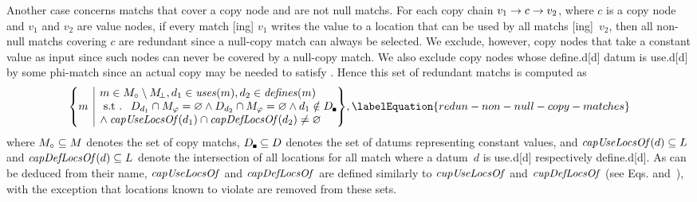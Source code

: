Another case concerns \glspl{match} that cover a \gls{copy node} and are not
\glspl{null match}.
%
For each copy chain \mbox{$v_1 \rightarrow c \rightarrow v_2$}, where $c$ is a
\gls{copy node} and $v_1$ and $v_2$ are \glspl{value node}, if every \gls{match}
[ing] $v_1$ writes the value to a \gls{location} that can be
used by all \glspl{match} [ing]~$v_2$, then all non-\glspl{null
  match} covering $c$ are redundant since a \gls{null-copy match} can always be
selected.
%
We exclude, however, \glspl{copy node} that take a constant value as input since
such \glspl{node} can never be covered by a \gls{null-copy match}.
%
We also exclude \glspl{copy node} whose \gls{define.d}[d] \gls{datum} is
\gls{use.d}[d] by some \gls{phi-match} since an actual copy may be needed to
satisfy .
%
Hence this set of redundant \glspl{match} is computed as
%
\begin{equation}
  \mSetBuilder*{m}%
               {%
                 \begin{array}{@{}l@{}}
                   m \in \mCopyMatchSet \setminus \mNullMatchSet,
                   d_1 \in \mUses(m),
                   d_2 \in \mDefines(m) \\
                   \text{\st }
                   \mDataSet[d_1] \cap \mPhiMatchSet = \mEmptySet
                   \mAnd
                   \mDataSet[d_2] \cap \mPhiMatchSet = \mEmptySet
                   \mAnd
                   d_1 \notin \mConstDataSet \\
                   \mbox{}\hspace{-2pt} \mAnd
                   \mCapUseLocsOf(d_1) \cap \mCapDefLocsOf(d_2) \neq \mEmptySet
                 \end{array}
               }\!,
  \labelEquation{redun-non-null-copy-matches}
\end{equation}
%
where \mbox{$\mCopyMatchSet \subseteq \mMatchSet$} denotes the set of
\glspl{copy match}, \mbox{$\mConstDataSet \subseteq \mDataSet$} denotes the set
of \glspl{datum} representing constant values, and \mbox{$\operatorname{\textrm{\textit{capUseLocsOf}}}(d)
  \subseteq L$} and \mbox{$\operatorname{\textrm{\textit{capDefLocsOf}}}(d) \subseteq
  L$} denote the intersection of all \glspl{location} for all
\gls{match} where a \gls{datum}~$d$ is \gls{use.d}[d] respectively
\gls{define.d}[d].
%
As can be deduced from their name, $\operatorname{\textrm{\textit{capUseLocsOf}}}$ and $\operatorname{\textrm{\textit{capDefLocsOf}}}$ are
defined similarly to $\operatorname{\textrm{\textit{cupUseLocsOf}}}$ and $\operatorname{\textrm{\textit{cupDefLocsOf}}}$ (see
Eqs.\thinspace{}
and~), with the exception that
\glspl{location} known to violate  are removed
from these sets.


